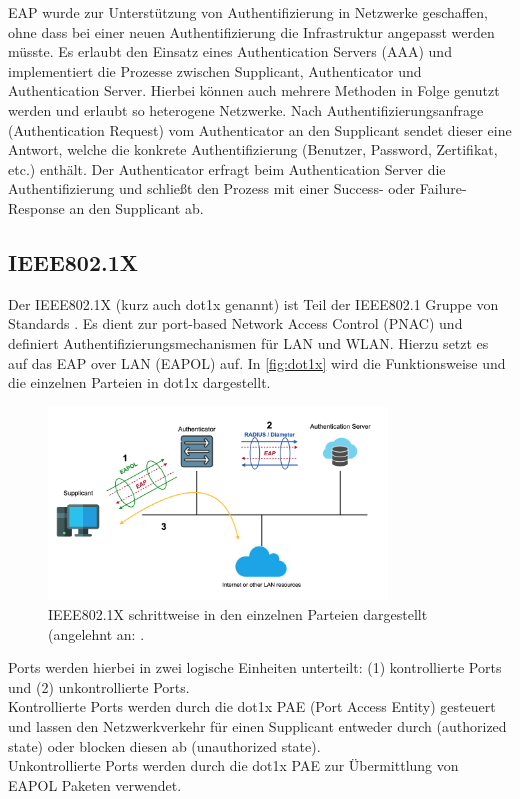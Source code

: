 \documentclass[conference]{IEEEtran}
\begin{document}
EAP wurde zur Unterstützung von Authentifizierung in Netzwerke geschaffen, ohne dass  bei einer neuen Authentifizierung die Infrastruktur angepasst werden müsste. Es erlaubt den Einsatz eines Authentication Servers (AAA) und implementiert die Prozesse zwischen Supplicant, Authenticator und Authentication Server. Hierbei können auch mehrere Methoden in Folge genutzt werden und erlaubt so heterogene Netzwerke. Nach Authentifizierungsanfrage (Authentication Request) vom Authenticator an den Supplicant sendet dieser eine Antwort, welche die konkrete Authentifizierung (Benutzer, Password, Zertifikat, etc.) enthält. Der Authenticator erfragt beim Authentication Server die Authentifizierung und schließt den Prozess mit einer Success- oder Failure-Response an den Supplicant ab.

\subsection{IEEE802.1X}
Der IEEE802.1X (kurz auch dot1x genannt) ist Teil der IEEE802.1 Gruppe von Standards \cite{5409813}. Es dient zur port-based Network Access Control (PNAC) und definiert Authentifizierungsmechanismen für LAN und WLAN. Hierzu setzt es auf das EAP over LAN (EAPOL) auf. In \autoref{fig:dot1x} wird die Funktionsweise und die einzelnen Parteien in dot1x dargestellt.\\

\begin{figure}[hbt]
	\centering
	\includegraphics[width=9cm]{figures/dot1x}
	\caption{IEEE802.1X schrittweise in den einzelnen Parteien dargestellt (angelehnt an: \cite{eap}.}
	\label{fig:dot1x}
\end{figure}

Ports werden hierbei in zwei logische Einheiten unterteilt: (1) kontrollierte Ports und (2) unkontrollierte Ports.\\
Kontrollierte Ports werden durch die dot1x PAE (Port Access Entity) gesteuert und lassen den Netzwerkverkehr für einen Supplicant entweder durch (authorized state) oder blocken diesen ab (unauthorized state).\\
Unkontrollierte Ports werden durch die dot1x PAE zur Übermittlung von EAPOL Paketen verwendet.
\end{document}
